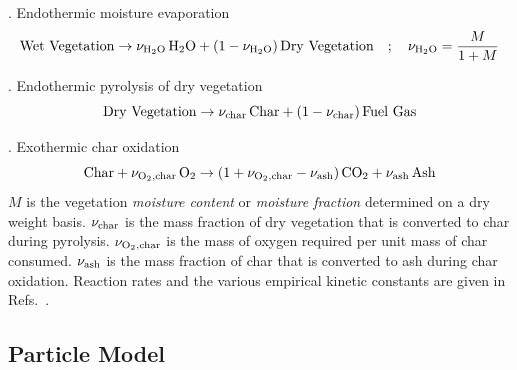 \documentclass[journal,article,atmosphere,submit,moreauthors,pdftex]{Definitions/mdpi}
\begin{document}
\vspace{\baselineskip}

. Endothermic moisture evaporation
\begin{equation}
 {\rm Wet\ Vegetation} \rightarrow \nu_{\rm H_2O} \, {\rm H_2O} + (1-\nu_{\rm H_2O}) \, {\rm Dry\ Vegetation} \quad ; \quad \nu_{\rm H_2O} = \frac{M}{1+M}
\end{equation}

. Endothermic pyrolysis of dry vegetation
\begin{equation}
 {\rm Dry\ Vegetation} \rightarrow \nu_{\rm char} \, {\rm Char} + (1-\nu_{\rm char}) \, {\rm Fuel\ Gas}
\end{equation}

. Exothermic char oxidation
\begin{equation}
 \label{char_reaction}
 {\rm Char} + \nu_{\rm O_2, char} \, {\rm O_2} \rightarrow (1+ \nu_{\rm O_2,char} - \nu_{\rm ash}) \, {\rm CO_2} + \nu_{\rm ash} \, {\rm Ash}
\end{equation}
$M$ is the vegetation {\em moisture content} or {\em moisture fraction} determined on a dry weight basis. $\nu_{\rm char}$ is the mass fraction of dry vegetation that is converted to char during pyrolysis.   $\nu_{\rm O_2,char}$ is the mass of oxygen required per unit mass of char consumed. $\nu_{\rm ash}$  is the mass fraction of char that is converted to ash during char oxidation. Reaction rates and the various empirical kinetic constants are given in Refs.~\cite{Porterie:2006,Morvan:CF2004,Houssami:2016}.

\subsection{Particle Model}
\label{particle_model}
\end{document}

